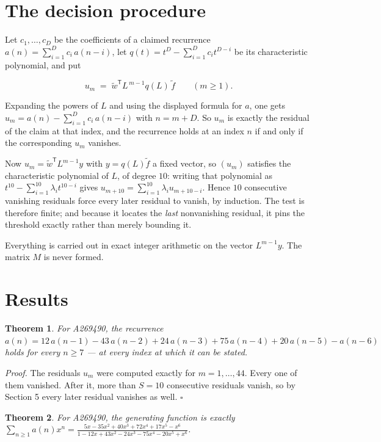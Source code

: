 \documentclass[11pt]{article}
\newtheorem{theorem}{Theorem}
\theoremstyle{definition}
\begin{document}
\section{The decision procedure}

Let $c_1,\dots,c_D$ be the coefficients of a claimed recurrence $a(n) = \sum_{i=1}^{D} c_i\,a(n-i)$, let $q(t) = t^{D} - \sum_{i=1}^{D} c_i t^{D-i}$ be its characteristic polynomial, and put

\[u_m \;=\; \tilde w^{\mathsf T} L^{\,m-1} q(L)\,\tilde f \qquad (m \ge 1).\]

Expanding the powers of $L$ and using the displayed formula for $a$, one gets $u_m = a(n) - \sum_{i=1}^{D} c_i\,a(n-i)$ with $n = m + D$. So $u_m$ is exactly the residual of the claim at that index, and the recurrence holds at an index $n$ if and only if the corresponding $u_m$ vanishes.

Now $u_m = \tilde w^{\mathsf T} L^{m-1} y$ with $y = q(L)\tilde f$ a fixed vector, so $(u_m)$ satisfies the characteristic polynomial of $L$, of degree $10$: writing that polynomial as $t^{10} - \sum_{i=1}^{10} \lambda_i t^{10-i}$ gives $u_{m+10} = \sum_{i=1}^{10} \lambda_i u_{m+10-i}$. Hence $10$ consecutive vanishing residuals force every later residual to vanish, by induction. The test is therefore finite; and because it locates the {\itshape last} nonvanishing residual, it pins the threshold exactly rather than merely bounding it.

Everything is carried out in exact integer arithmetic on the vector $L^{m-1}y$. The matrix $M$ is never formed.

\section{Results}

\begin{theorem} For A269490, the recurrence $a(n) = 12\,a(n-1) - 43\,a(n-2) + 24\,a(n-3) + 75\,a(n-4) + 20\,a(n-5) - a(n-6)$ holds for every $n \ge 7$ --- at every index at which it can be stated.\end{theorem}

{\itshape Proof.} The residuals $u_m$ were computed exactly for $m = 1,\dots,44$. Every one of them vanished. After it, more than $S = 10$ consecutive residuals vanish, so by Section 5 every later residual vanishes as well. $\square$

\begin{theorem} For A269490, the generating function is exactly $\sum_{n\ge 1} a(n)x^n = \frac{5x - 35x^{2} + 40x^{3} + 72x^{4} + 17x^{5} - x^{6}}{1 - 12x + 43x^{2} - 24x^{3} - 75x^{4} - 20x^{5} + x^{6}}$.\end{theorem}
\end{document}
